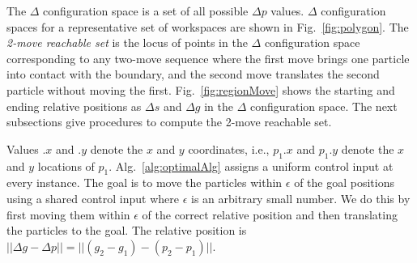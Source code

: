 The $\Delta$ configuration space is a set of all possible $\Delta p$ values.
 $\Delta$ configuration spaces for a representative set of workspaces are shown in Fig.~\ref{fig:polygon}. The \emph{2-move reachable set} is the locus of points in the $\Delta$ configuration space corresponding to any two-move sequence where the first move brings one particle into contact with the boundary, and the second move translates the second particle without moving the first.
 Fig.~\ref{fig:regionMove} shows the starting and ending relative positions as $\Delta s$ and $\Delta g$ in the $\Delta$ configuration space.  The next subsections give procedures to compute the 2-move reachable set.%
 
  Values $.x$ and $.y$ denote the $x$ and $y$ coordinates, i.e., $p_1.x$ and $p_1.y$ denote the $x$ and $y$ locations of $p_1$. 
Alg.~\ref{alg:optimalAlg} assigns a uniform control input at every instance.
The goal is to move the particles within $\epsilon$ of the goal positions using a shared control input where $\epsilon$ is an arbitrary small number. We do this by first moving them within $\epsilon$ of the correct relative position and then translating the particles to the goal. The relative position is $||\Delta g - \Delta p || = ||(g_2-g_1)- (p_2-p_1)||$.  


